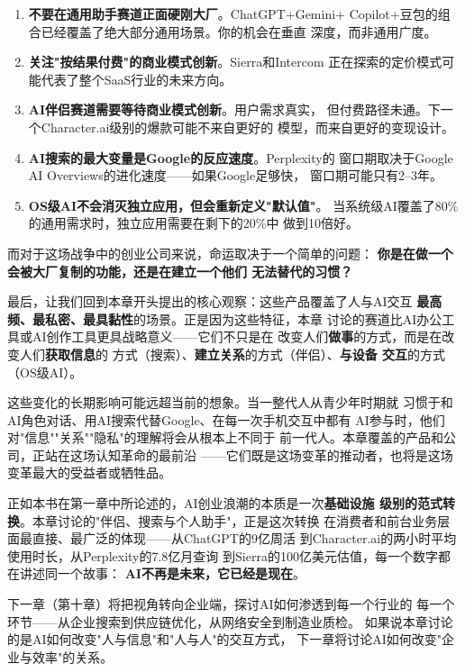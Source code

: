 \begin{enumerate}
  \item \textbf{不要在通用助手赛道正面硬刚大厂}。ChatGPT+Gemini+
    Copilot+豆包的组合已经覆盖了绝大部分通用场景。你的机会在垂直
    深度，而非通用广度。
  \item \textbf{关注"按结果付费"的商业模式创新}。Sierra和Intercom
    正在探索的定价模式可能代表了整个SaaS行业的未来方向。
  \item \textbf{AI伴侣赛道需要等待商业模式创新}。用户需求真实，
    但付费路径未通。下一个Character.ai级别的爆款可能不来自更好的
    模型，而来自更好的变现设计。
  \item \textbf{AI搜索的最大变量是Google的反应速度}。Perplexity的
    窗口期取决于Google AI Overviews的进化速度——如果Google足够快，
    窗口期可能只有2--3年。
  \item \textbf{OS级AI不会消灭独立应用，但会重新定义"默认值"}。
    当系统级AI覆盖了80\%的通用需求时，独立应用需要在剩下的20\%中
    做到10倍好。
\end{enumerate}

而对于这场战争中的创业公司来说，命运取决于一个简单的问题：
\textbf{你是在做一个会被大厂复制的功能，还是在建立一个他们
无法替代的习惯？}

最后，让我们回到本章开头提出的核心观察：这些产品覆盖了人与AI交互
\textbf{最高频、最私密、最具黏性}的场景。正是因为这些特征，本章
讨论的赛道比AI办公工具或AI创作工具更具战略意义——它们不只是在
改变人们\textbf{做事}的方式，而是在改变人们\textbf{获取信息}的
方式（搜索）、\textbf{建立关系}的方式（伴侣）、\textbf{与设备
交互}的方式（OS级AI）。

这些变化的长期影响可能远超当前的想象。当一整代人从青少年时期就
习惯于和AI角色对话、用AI搜索代替Google、在每一次手机交互中都有
AI参与时，他们对"信息""关系""隐私"的理解将会从根本上不同于
前一代人。本章覆盖的产品和公司，正站在这场认知革命的最前沿
——它们既是这场变革的推动者，也将是这场变革最大的受益者或牺牲品。

正如本书在第一章中所论述的，AI创业浪潮的本质是一次\textbf{基础设施
级别的范式转换}。本章讨论的"伴侣、搜索与个人助手"，正是这次转换
在消费者和前台业务层面最直接、最广泛的体现——从ChatGPT的9亿周活
到Character.ai的两小时平均使用时长，从Perplexity的7.8亿月查询
到Sierra的100亿美元估值，每一个数字都在讲述同一个故事：
\textbf{AI不再是未来，它已经是现在}。

下一章（第十章）将把视角转向企业端，探讨AI如何渗透到每一个行业的
每一个环节——从企业搜索到供应链优化，从网络安全到制造业质检。
如果说本章讨论的是AI如何改变"人与信息"和"人与人"的交互方式，
下一章将讨论AI如何改变"企业与效率"的关系。
